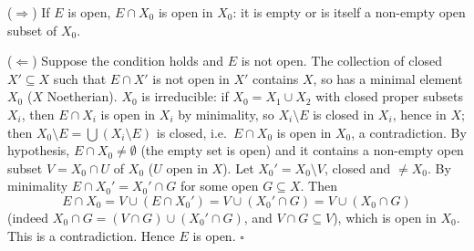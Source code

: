 \documentclass[11pt]{article}
\begin{document}
\pf
($\Rightarrow$) If $E$ is open, $E\cap X_0$ is open in $X_0$: it is empty or is itself a non-empty open subset of $X_0$.

($\Leftarrow$) Suppose the condition holds and $E$ is not open. The collection of closed $X'\subseteq X$ such that $E\cap X'$ is not open in $X'$ contains $X$, so has a minimal element $X_0$ ($X$ Noetherian). $X_0$ is irreducible: if $X_0=X_1\cup X_2$ with closed proper subsets $X_i$, then $E\cap X_i$ is open in $X_i$ by minimality, so $X_i\setminus E$ is closed in $X_i$, hence in $X$; then $X_0\setminus E=\bigcup(X_i\setminus E)$ is closed, i.e.\ $E\cap X_0$ is open in $X_0$, a contradiction. By hypothesis, $E\cap X_0\ne\emptyset$ (the empty set is open) and it contains a non-empty open subset $V=X_0\cap U$ of $X_0$ ($U$ open in $X$). Let $X_0'=X_0\setminus V$, closed and $\ne X_0$. By minimality $E\cap X_0'=X_0'\cap G$ for some open $G\subseteq X$. Then
\[
E\cap X_0=V\cup(E\cap X_0')=V\cup(X_0'\cap G)=V\cup(X_0\cap G)
\]
(indeed $X_0\cap G=(V\cap G)\cup(X_0'\cap G)$, and $V\cap G\subseteq V$), which is open in $X_0$. This is a contradiction. Hence $E$ is open. \hfill$\square$
\end{document}
